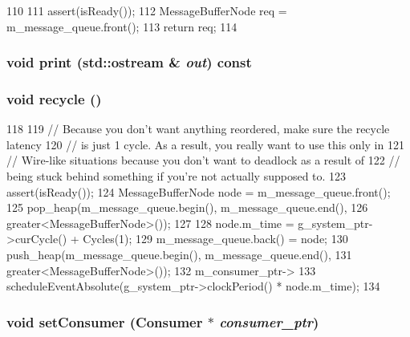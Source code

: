 \begin{DoxyCode}
110 {
111     assert(isReady());
112     MessageBufferNode req = m_message_queue.front();
113     return req;
114 }
\end{DoxyCode}
\hypertarget{classWireBuffer_ac55fe386a101fbae38c716067c9966a0}{
\subsubsection[{print}]{\setlength{\rightskip}{0pt plus 5cm}void print (std::ostream \& {\em out}) const}}
\label{classWireBuffer_ac55fe386a101fbae38c716067c9966a0}
\hypertarget{classWireBuffer_a98102238652df03cf871c9766de96af2}{
\subsubsection[{recycle}]{\setlength{\rightskip}{0pt plus 5cm}void recycle ()}}
\label{classWireBuffer_a98102238652df03cf871c9766de96af2}



\begin{DoxyCode}
118 {
119     // Because you don't want anything reordered, make sure the recycle latency
120     // is just 1 cycle. As a result, you really want to use this only in
121     // Wire-like situations because you don't want to deadlock as a result of
122     // being stuck behind something if you're not actually supposed to.
123     assert(isReady());
124     MessageBufferNode node = m_message_queue.front();
125     pop_heap(m_message_queue.begin(), m_message_queue.end(),
126         greater<MessageBufferNode>());
127 
128     node.m_time = g_system_ptr->curCycle() + Cycles(1);
129     m_message_queue.back() = node;
130     push_heap(m_message_queue.begin(), m_message_queue.end(),
131         greater<MessageBufferNode>());
132     m_consumer_ptr->
133         scheduleEventAbsolute(g_system_ptr->clockPeriod() * node.m_time);
134 }
\end{DoxyCode}
\hypertarget{classWireBuffer_a8487c37680239f103e21ada9acf1726d}{
\subsubsection[{setConsumer}]{\setlength{\rightskip}{0pt plus 5cm}void setConsumer ({\bf Consumer} $\ast$ {\em consumer\_\-ptr})}}
\label{classWireBuffer_a8487c37680239f103e21ada9acf1726d}



